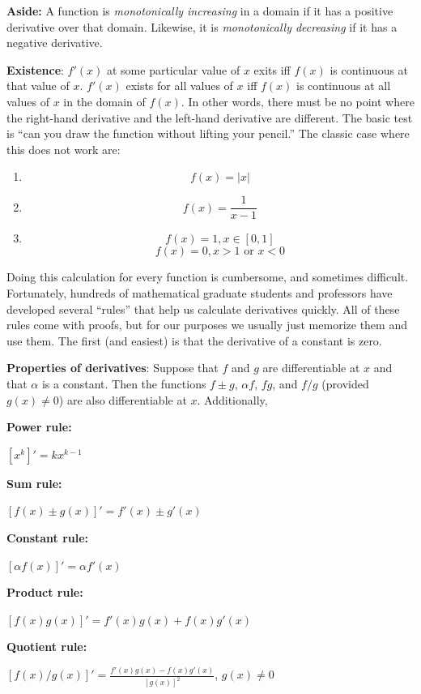 \documentclass[20pt]{extarticle}
\newcommand{\be}{\begin{enumerate}}
\newcommand{\ee}{\end{enumerate}}
\newcommand{\pbt}{\parbox[t]{2in}}
\begin{document}
\item \textbf{Aside:} A function is \textit{monotonically increasing}
  in a domain if it has a positive derivative over that domain.
  Likewise, it is \textit{monotonically decreasing} if it has a negative
  derivative.

\item \textbf{Existence}: $f'(x)$ at some particular value of $x$
  exits iff $f(x)$ is continuous at that value of $x$.  $f'(x)$ exists
  for all values of $x$ iff $f(x)$ is continuous at all values of $x$
  in the domain of $f(x)$.  In other words, there must be no point
  where the right-hand derivative and the left-hand derivative are
  different.  The basic test is ``can you draw the function without
  lifting your pencil.''  The classic case where this does not work
  are:

\be
\item $$f(x) = |x|$$
\item $$ f(x) = \frac{1}{x-1}$$
\item $$f(x) = 1, x \in [0,1]$$
$$ f(x) = 0,  x > 1 \mbox{ or } x<0$$
\ee 


\item Doing this calculation for every function is cumbersome, and
  sometimes difficult.  Fortunately, hundreds of mathematical graduate
  students and professors have developed several ``rules'' that help
  us calculate derivatives quickly.  All of these rules come with
  proofs, but for our purposes we usually just memorize them and use
  them.  The first (and easiest) is that the derivative of a constant
  is zero.


\textbf{Properties of derivatives}:  Suppose that $f$ and $g$ are
differentiable at $x$ and that $\alpha$ is a constant.  Then the
functions $f\pm g$, $\alpha f$, $f g$, and $f/g$ (provided $g(x)\ne 0$)
are also differentiable at $x$.  Additionally,\\
  \pbt{\bf Power rule:} $[x^k]' = k x^{k-1}$  \\
  \pbt{\bf Sum rule:} $[f(x)\pm g(x)]' = f'(x)\pm g'(x)$ \\
  \pbt{\bf Constant rule:} $[\alpha f(x)]' = \alpha f'(x)$ \\
  \pbt{\bf Product rule:} $[f(x)g(x)]' = f'(x)g(x)+f(x)g'(x)$\\
  \pbt{\bf Quotient rule:} $[f(x)/g(x)]' =
\frac{f'(x)g(x)-f(x)g'(x)}{[g(x)]^2}$, $g(x)\ne 0$\\
\end{document}
